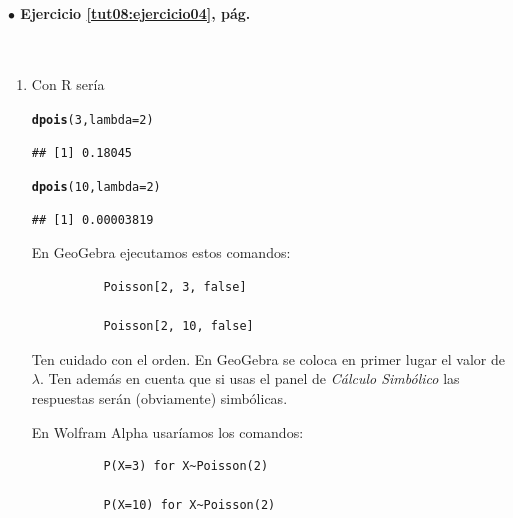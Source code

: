 \documentclass[10pt,a4paper]{article}\usepackage[]{graphicx}\usepackage[]{color}
\makeatletter
\newcommand{\hlnum}[1]{\textcolor[rgb]{0.686,0.059,0.569}{#1}}%
\newcommand{\hlstd}[1]{\textcolor[rgb]{0.345,0.345,0.345}{#1}}%
\newcommand{\hlkwc}[1]{\textcolor[rgb]{0.333,0.667,0.333}{#1}}%
\newcommand{\hlkwd}[1]{\textcolor[rgb]{0.737,0.353,0.396}{\textbf{#1}}}%
\newenvironment{kframe}{%
 \def\at@end@of@kframe{}%
 \ifinner\ifhmode%
  \def\at@end@of@kframe{\end{minipage}}%
  \begin{minipage}{\columnwidth}%
 \fi\fi%
 \def\FrameCommand##1{\hskip\@totalleftmargin \hskip-\fboxsep
 \colorbox{shadecolor}{##1}\hskip-\fboxsep
     \hskip-\linewidth \hskip-\@totalleftmargin \hskip\columnwidth}%
 \MakeFramed {\advance\hsize-\width
   \@totalleftmargin\z@ \linewidth\hsize
   \@setminipage}}%
 {\par\unskip\endMakeFramed%
 \at@end@of@kframe}
\newenvironment{knitrout}{}{} %
\makeatother
\begin{document}
\paragraph{\bf $\bullet$ Ejercicio \ref{tut08:ejercicio04}, pág. \pageref{tut08:ejercicio04}}
\label{tut08:ejercicio04:sol}\quad\\

\begin{enumerate}
  \item Con R sería
\begin{knitrout}
\color{fgcolor}\begin{kframe}
\begin{alltt}
\hlkwd{dpois}\hlstd{(}\hlnum{3}\hlstd{,} \hlkwc{lambda}\hlstd{=}\hlnum{2}\hlstd{)}
\end{alltt}
\begin{verbatim}
## [1] 0.18045
\end{verbatim}
\begin{alltt}
\hlkwd{dpois}\hlstd{(}\hlnum{10}\hlstd{,} \hlkwc{lambda}\hlstd{=}\hlnum{2}\hlstd{)}
\end{alltt}
\begin{verbatim}
## [1] 0.00003819
\end{verbatim}
\end{kframe}
\end{knitrout}

        En GeoGebra ejecutamos estos comandos:

        \begin{verbatim}
          Poisson[2, 3, false]

          Poisson[2, 10, false]
        \end{verbatim}
        Ten cuidado con el orden. En GeoGebra se coloca en primer lugar el valor de $\lambda$. Ten además en cuenta que si usas el panel de {\em Cálculo Simbólico} las respuestas serán (obviamente) simbólicas.

        En Wolfram Alpha usaríamos los comandos:
        \begin{verbatim}
          P(X=3) for X~Poisson(2)

          P(X=10) for X~Poisson(2)
        \end{verbatim}


\end{enumerate}
\end{document}
